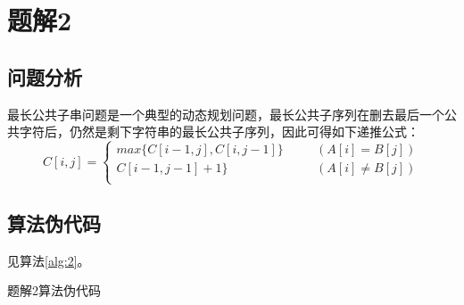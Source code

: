 \section{题解2}
\subsection{问题分析}
最长公共子串问题是一个典型的动态规划问题，最长公共子序列在删去最后一个公共字符后，仍然是剩下字符串的最长公共子序列，因此可得如下递推公式：
$$
C[i,j]=\left\{
\begin{aligned}
    max\{C[i-1,j],C[i,j-1]\}&\quad&(A[i]=B[j])\\
    C[i-1,j-1]+1\}&&(A[i]\not =B[j])\\
\end{aligned}
\right.
$$

\subsection{算法伪代码}
见算法\ref{alg:2}。
\begin{algorithm}[htbp]
\caption{题解2算法伪代码}\label{alg:2}
\end{algorithm}